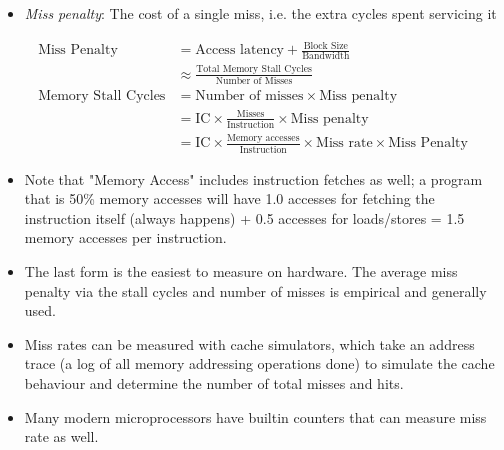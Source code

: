 \documentclass[11pt, a4paper]{article}
\theoremstyle{definition}
\theoremstyle{remark}
\begin{document}
\begin{itemize}
  \item \textit{Miss penalty}: The cost of a single miss, i.e. the extra cycles spent servicing it
\end{itemize}
\begin{align*}
\text{Miss Penalty} &= \text{Access latency} + \frac{\text{Block Size}}{\text{Bandwidth}} \\
& \approx \frac{\text{Total Memory Stall Cycles}}{\text{Number of Misses}} \\
\text{Memory Stall Cycles} &= \text{Number of misses} \times \text{Miss penalty} \\ 
&= \text{IC} \times \frac{\text{Misses}}{\text{Instruction}} \times \text{Miss penalty} \\ 
&= \text{IC} \times \frac{\text{Memory accesses}}{\text{Instruction}} \times \text{Miss rate} \times \text{Miss Penalty}
\end{align*}
\begin{itemize}
  \item Note that "Memory Access" includes instruction fetches as well; a program that is 50\% memory accesses will have 1.0 accesses for fetching the instruction itself (always happens) + 0.5 accesses for loads/stores = 1.5 memory accesses per instruction.
  \item The last form is the easiest to measure on hardware. The average miss penalty via the stall cycles and number of misses is empirical and generally used.
  \item Miss rates can be measured with cache simulators, which take an address trace (a log of all memory addressing operations done) to simulate the cache behaviour and determine the number of total misses and hits.
  \item Many modern microprocessors have builtin counters that can measure miss rate as well.
\end{itemize}
\end{document}
